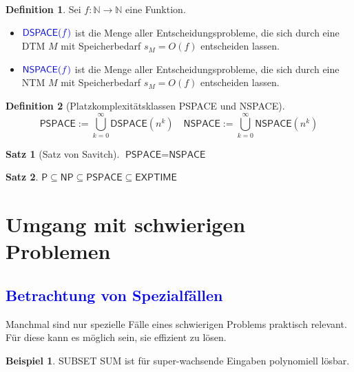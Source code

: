 \documentclass{scrreprt}
\theoremstyle{definition}
\newtheorem{Definition}{Definition}[section]
\newtheorem{Satz}{Satz}[section]
\theoremstyle{example}
\newtheorem{Beispiel}{Beispiel}[section]
\theoremstyle{algorithm}
\begin{document}
\begin{Definition}
Sei $f: \mathbb{N} \rightarrow \mathbb{N}$ eine Funktion.
\begin{itemize}
\item
$\textcolor{blue}{\textsf{DSPACE}(f)}$ ist die Menge aller Entscheidungsprobleme, die sich durch eine DTM $M$ mit Speicherbedarf $s_M = O(f)$ entscheiden lassen.
\item
$\textcolor{blue}{\textsf{NSPACE}(f)}$ ist die Menge aller Entscheidungsprobleme, die sich durch eine NTM $M$ mit Speicherbedarf $s_M = O(f)$ entscheiden lassen.
\end{itemize}
\end{Definition}

\begin{Definition}[Platzkomplexitätsklassen \textsf{PSPACE} und \textsf{NSPACE}]
\begin{equation*}
\textsf{PSPACE} := \bigcup_{k=0}^\infty \textsf{DSPACE}(n^k) \quad \textsf{NSPACE} := \bigcup_{k=0}^\infty \textsf{NSPACE}(n^k)
\end{equation*}
\end{Definition}

\begin{Satz}[Satz von Savitch]
$\textsf{PSPACE}=\textsf{NSPACE}$
\end{Satz}

\begin{Satz}
$\textsf{P}\subseteq\textsf{NP}\subseteq\textsf{PSPACE}\subseteq\textsf{EXPTIME}$
\end{Satz}

\section{Umgang mit schwierigen Problemen}
\subsection{\textcolor{blue}{Betrachtung von Spezialfällen}}
Manchmal sind nur spezielle Fälle eines schwierigen Problems praktisch relevant. Für diese kann es möglich sein, sie effizient zu lösen.
\begin{Beispiel}
\textsf{SUBSET SUM} ist für {\glqq}super-wachsende{\grqq} Eingaben polynomiell lösbar.
\end{Beispiel}
\end{document}

